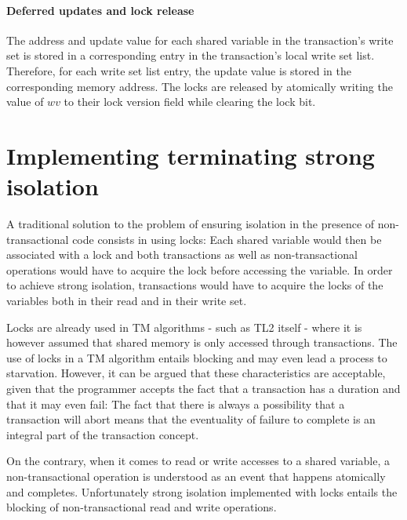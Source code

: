 \documentclass[11pt,letterpaper]{article}
\begin{document}
\paragraph{Deferred updates and lock release}
The   address  and   update  value   for  each   shared  variable   in  the
transaction{}'s write set is stored in a corresponding  
entry  in the  transaction{}'s local  write set  list. Therefore,  for each
write set list entry, the update value is stored in the  
corresponding memory address. The  locks are released by atomically writing
the value of $\mathit{wv}$ to their lock  
version field  while clearing the lock bit. 




\section{Implementing terminating strong  isolation}
\label{sec:protocol}

A traditional  solution to  the problem of  ensuring isolation   in the
presence of  non-transactional code consists in using  locks: Each shared
variable would then  
be associated with a lock and both transactions as well as non-transactional 
operations would have to acquire the lock before accessing the variable. In
order  to achieve strong isolation,  transactions would have to acquire the
locks of the  variables both in their read and in their write set.

Locks are already used  in TM algorithms - such as TL2  itself - where it is
however     assumed   that  shared   memory   is   only  accessed   through
transactions. The use  of locks  in a TM algorithm  entails blocking and may
even lead a process to starvation. However,  
it can be argued that  these characteristics are acceptable, given that the
programmer  accepts the fact that a  transaction has a duration and that it
may  even  fail: The  fact  that   there is  always  a  possibility that  a
transaction will abort means that the eventuality of  
failure to complete is an integral part of the transaction concept.  

On  the contrary,  when it  comes to  read or  write accesses  to  a shared
variable, a  non-transactional operation is  understood  as an
event  that  happens   atomically  and   completes.  Unfortunately   strong
isolation  implemented with  locks  entails the blocking  
of non-transactional read and write operations.
\end{document}
